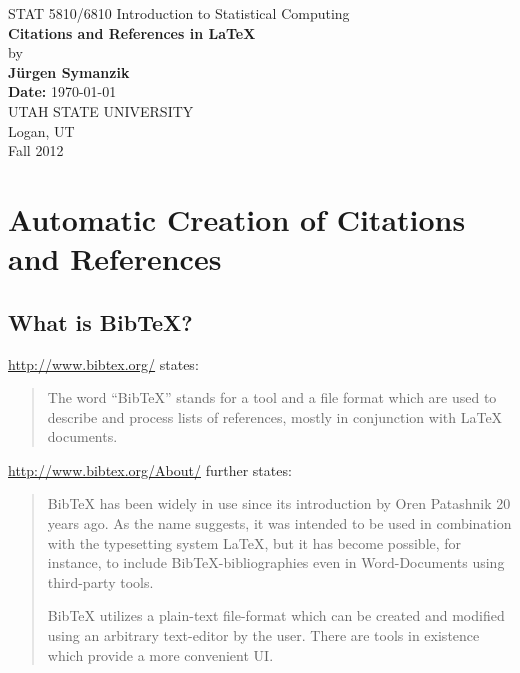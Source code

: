 \documentclass[12pt]{article}
\begin{document}


\begin{titlepage}

\begin{center}
{\large STAT 5810/6810 Introduction to Statistical Computing} \\[4cm]

{\LARGE \bf Citations and References in LaTeX} \\[1cm]
by \\[0.5cm]
{\bf J\"urgen Symanzik} \\[2.5cm]
{\bf Date:} \today \\[2cm]

UTAH STATE UNIVERSITY \\[0.5cm]
Logan, UT \\[0.5cm]
Fall 2012 \\[0.5cm]
\end{center}

\thispagestyle{empty}
\vfill
\end{titlepage}


\newpage 



\tableofcontents


\newpage



\section{Automatic Creation of Citations and References}


\subsection{What is BibTeX?}

\url{http://www.bibtex.org/} states:
\begin{quotation}
The word ``BibTeX'' stands for a tool and a file format which are used to describe and process lists of references, mostly in conjunction with LaTeX documents.
\end{quotation}


\noindent
\url{http://www.bibtex.org/About/} further states:
\begin{quotation}
BibTeX has been widely in use since its introduction by Oren Patashnik 20 years ago. As the name suggests, it was intended to be used in combination with the typesetting system LaTeX, but it has become possible, for instance, to include BibTeX-bibliographies even in Word-Documents using third-party tools.

BibTeX utilizes a plain-text file-format which can be created and modified using an arbitrary text-editor by the user. There are tools in existence which provide a more convenient UI.
\end{quotation}
\end{document}
